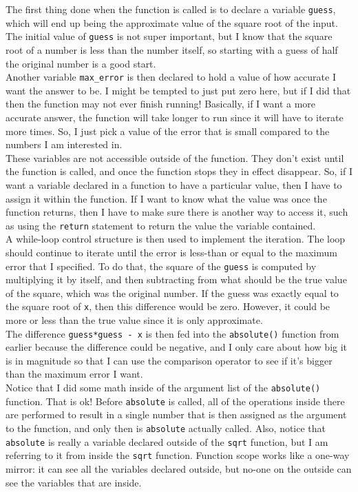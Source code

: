 The first thing done when the function is called is to declare a variable \texttt{guess}, which will end up being the approximate value of the square root of the input. The initial value of \texttt{guess} is not super important, but I know that the square root of a number is less than the number itself, so starting with a guess of half the original number is a good start.\\

Another variable \texttt{max\_error} is then declared to hold a value of how accurate I want the answer to be. I might be tempted to just put zero here, but if I did that then the function may not ever finish running! Basically, if I want a more accurate answer, the function will take longer to run since it will have to iterate more times. So, I just pick a value of the error that is small compared to the numbers I am interested in.\\

These variables are not accessible outside of the function. They don't exist until the function is called, and once the function stops they in effect disappear. So, if I want a variable declared in a function to have a particular value, then I have to assign it within the function. If I want to know what the value was once the function returns, then I have to make sure there is another way to access it, such as using the \texttt{return} statement to return the value the variable contained.\\

A while-loop control structure is then used to implement the iteration. The loop should continue to iterate until the error is less-than or equal to the maximum error that I specified. To do that, the square of the \texttt{guess} is computed by multiplying it by itself, and then subtracting from what should be the true value of the square, which was the original number. If the guess was exactly equal to the square root of \texttt{x}, then this difference would be zero. However, it could be more or less than the true value since it is only approximate.\\

The difference \texttt{guess*guess - x} is then fed into the \texttt{absolute()} function from earlier because the difference could be negative, and I only care about how big it is in magnitude so that I can use the comparison operator to see if it's bigger than the maximum error I want.\\

Notice that I did some math inside of the argument list of the \texttt{absolute()} function. That is ok! Before \texttt{absolute} is called, all of the operations inside there are performed to result in a single number that is then assigned as the argument to the function, and only then is \texttt{absolute} actually called. Also, notice that \texttt{absolute} is really a variable declared outside of the \texttt{sqrt} function, but I am referring to it from inside the \texttt{sqrt} function. Function scope works like a one-way mirror: it can see all the variables declared outside, but no-one on the outside can see the variables that are inside.\\

